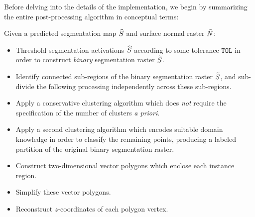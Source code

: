 Before delving into the details of the implementation, we begin by summarizing the entire post-processing algorithm in conceptual terms:

\begin{leftbar}
  \noindent
  Given a predicted segmentation map $\widehat{S}$ and surface normal raster $\widehat{N}$:
  \begin{itemize}[leftmargin=*]
    \item Threshold segmentation activations $\widehat{S}$ according to some tolerance $\texttt{TOL}$ in order to construct \emph{binary} segmentation raster $\widetilde{S}$.
    \item Identify connected sub-regions of the binary segmentation raster $\widetilde{S}$, and sub-divide the following processing independently across these sub-regions.
    \item Apply a conservative clustering algorithm which does \emph{not} require the specification of the number of clusters \textit{a priori}.
    \item Apply a second clustering algorithm which encodes suitable domain knowledge in order to classify the remaining points, producing a labeled partition of the original binary segmentation raster.
    \item Construct two-dimensional vector polygons which enclose each instance region.
    \item Simplify these vector polygons.
    \item Reconstruct $z$-coordinates of each polygon vertex.
  \end{itemize}
\end{leftbar}
